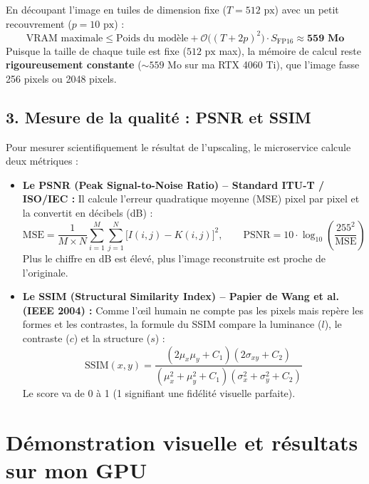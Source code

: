 \documentclass[11pt,a4paper]{article}
\begin{document}
En découpant l'image en tuiles de dimension fixe ($T = 512\text{ px}$) avec un petit recouvrement ($p = 10\text{ px}$) :
\begin{equation}
    \text{VRAM maximale} \le \text{Poids du modèle} + \mathcal{O}\bigl((T + 2p)^2\bigr) \cdot S_{\text{FP16}} \approx \mathbf{559\text{ Mo}}
\end{equation}
Puisque la taille de chaque tuile est fixe ($512\text{ px}$ max), la mémoire de calcul reste \textbf{rigoureusement constante} ($\sim 559$ Mo sur ma RTX 4060 Ti), que l'image fasse 256 pixels ou 2048 pixels.

\subsection{3. Mesure de la qualité : PSNR et SSIM}
Pour mesurer scientifiquement le résultat de l'upscaling, le microservice calcule deux métriques :

\begin{itemize}[leftmargin=*]
    \item \textbf{Le PSNR (Peak Signal-to-Noise Ratio) -- Standard ITU-T / ISO/IEC :}
    Il calcule l'erreur quadratique moyenne (MSE) pixel par pixel et la convertit en décibels (dB) :
    \begin{equation}
        \text{MSE} = \frac{1}{M \times N} \sum_{i=1}^M \sum_{j=1}^N \bigl[ I(i,j) - K(i,j) \bigr]^2, \qquad
        \text{PSNR} = 10 \cdot \log_{10}\left(\frac{255^2}{\text{MSE}}\right)
    \end{equation}
    Plus le chiffre en dB est élevé, plus l'image reconstruite est proche de l'originale.
    
    \item \textbf{Le SSIM (Structural Similarity Index) -- Papier de Wang et al. (IEEE 2004) :}
    Comme l'œil humain ne compte pas les pixels mais repère les formes et les contrastes, la formule du SSIM compare la luminance ($l$), le contraste ($c$) et la structure ($s$) :
    \begin{equation}
        \text{SSIM}(x,y) = \frac{(2\mu_x\mu_y + C_1)(2\sigma_{xy} + C_2)}{(\mu_x^2 + \mu_y^2 + C_1)(\sigma_x^2 + \sigma_y^2 + C_2)}
    \end{equation}
    Le score va de 0 à 1 (1 signifiant une fidélité visuelle parfaite).
\end{itemize}

\section{Démonstration visuelle et résultats sur mon GPU}
\end{document}
